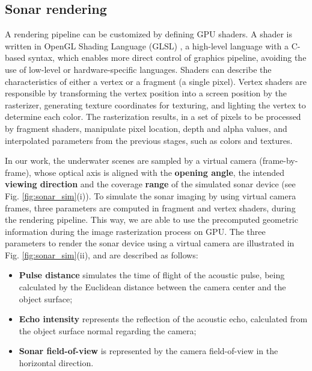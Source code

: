 \documentclass[final,5p,times]{elsarticle}
\begin{document}
\subsection{Sonar rendering}
\label{dev:shader}

A rendering pipeline can be customized by defining GPU shaders. A shader is written in OpenGL Shading Language (GLSL) \cite{rost2009}, a high-level language with a C-based syntax, which enables more direct control of graphics pipeline, avoiding the use of low-level or hardware-specific languages. Shaders can describe the characteristics of either a vertex or a fragment (a single pixel). Vertex shaders are responsible by transforming the vertex position into a screen position by the rasterizer, generating texture coordinates for texturing, and lighting the vertex to determine each color. The rasterization results, in a set of pixels to be processed by fragment shaders, manipulate pixel location, depth and alpha values, and interpolated parameters from the previous stages, such as colors and textures.

In our work, the underwater scenes are sampled by a virtual camera (frame-by-frame), whose optical axis is aligned with the \textbf{opening angle}, the intended \textbf{viewing direction} and the coverage \textbf{range} of the simulated sonar device (see Fig. \ref{fig:sonar_sim}(i)). To simulate the sonar imaging by using virtual camera frames, three parameters are computed in fragment and vertex shaders, during the rendering pipeline. This way, we are able to use the precomputed geometric information during the image rasterization process on GPU. The three parameters to render the sonar device using a virtual camera are illustrated in Fig. \ref{fig:sonar_sim}(ii), and are described as follows:

\begin{itemize}[]
    \item \textbf{Pulse distance} simulates the time of flight of the acoustic pulse, being calculated by the Euclidean distance between the camera center and the object surface;
    \item \textbf{Echo intensity} represents the reflection of the acoustic echo, calculated from the object surface normal regarding the camera;
    \item \textbf{Sonar field-of-view} is represented by the camera field-of-view in the horizontal direction.
\end{itemize}
\end{document}
